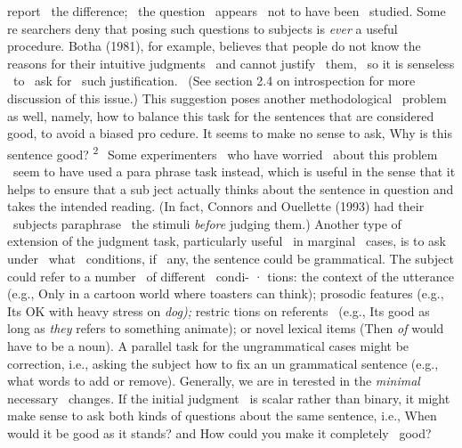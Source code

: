 \clearpage\setcounter{page}{1}\begin{styleStandard}
report \ the difference; \ the question \ appears \ not to have been \ studied. Some re\- searchers deny that posing such questions to subjects is \textit{ever}\textit{ }a useful procedure. Botha (1981), for example, believes that people do not know the reasons for their intuitive judgments \ and cannot justify \ them, \ so it is senseless \ to \ ask for \ such justification. \ (See section 2.4 on introspection for more discussion of this issue.) This suggestion poses another methodological \ problem as well, namely, how to balance this task for the sentences that are considered good, to avoid a biased pro\- cedure. It seems to make no sense to ask, {\textquotedbl}Why is this sentence good?{\textquotedbl} \textsuperscript{2 }\textsuperscript{\ }Some experimenters \ who have worried \ about this problem \ seem to have used a para\- phrase task instead, which is useful in the sense that it helps to ensure that a sub\- ject actually thinks about the sentence in question and takes the intended reading. (In fact, Connors and Ouellette (1993) had their \ subjects paraphrase \ the stimuli \textit{before}\textit{ }judging them.) Another type of extension of the judgment task, particularly useful \ in marginal \ cases, is to ask under \ what \ conditions, if \ any, the sentence could be grammatical. The subject could refer to a number \ of different \ condi- · tions: the context of the utterance (e.g., {\textquotedbl}Only in a cartoon world where toasters can think{\textquotedbl}); prosodic features (e.g., {\textquotedbl}It{\textquotesingle}s OK with heavy stress on \textit{dog{\textquotedbl});}\textit{ }restric\- tions on referents \ (e.g., {\textquotedbl}It{\textquotesingle}s good as long as \textit{they}\textit{ }refers to something animate{\textquotedbl}); or novel lexical items ({\textquotedbl}Then \textit{of}\textit{ }would have to be a noun{\textquotedbl}). A parallel task for the ungrammatical cases might be correction, i.e., asking the subject how to fix an un\- grammatical sentence (e.g., what words to add or remove). Generally, we are in\- terested in the \textit{minimal}\textit{ }necessary \ changes. If the initial judgment \ is scalar rather than binary, it might make sense to ask both kinds of questions about the same sentence, i.e., {\textquotedbl}When would it be good as it stands?{\textquotedbl} and {\textquotedbl}How could you make it completely \ good?{\textquotedbl}
\end{styleStandard}


